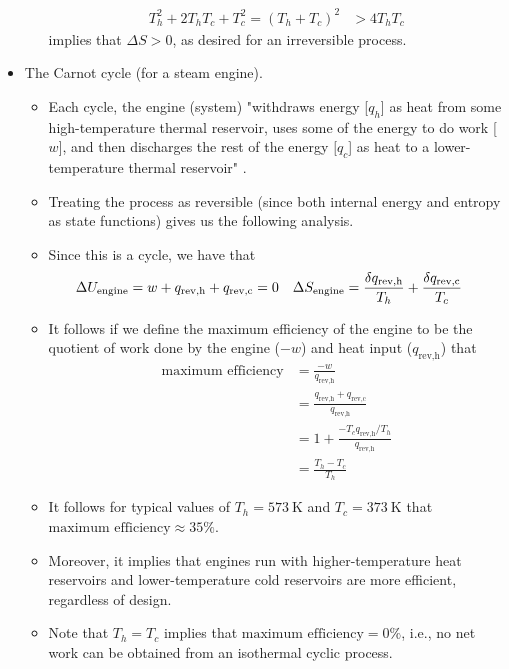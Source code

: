 \documentclass[../notes.tex]{subfiles}
\begin{document}
\begin{itemize}
\begin{itemize}
\begin{align*}
            T_h^2+2T_hT_c+T_c^2 = (T_h+T_c)^2 &> 4T_hT_c
        \end{align*}
        implies that $\Delta S>0$, as desired for an irreversible process.
    \end{itemize}
    \item The Carnot cycle (for a steam engine).
    \begin{itemize}
        \item Each cycle, the engine (system) "withdraws energy [$q_h$] as heat from some high-temperature thermal reservoir, uses some of the energy to do work [$w$], and then discharges the rest of the energy $[q_c$] as heat to a lower-temperature thermal reservoir" \parencite[838]{bib:McQuarrieSimon}.
        \item Treating the process as reversible (since both internal energy and entropy as state functions) gives us the following analysis.
        \item Since this is a cycle, we have that
        \begin{align*}
            \Delta U_\text{engine} &= w+q_\text{rev,h}+q_\text{rev,c} = 0&
            \Delta S_\text{engine} &= \frac{\var{q_\text{rev,h}}}{T_h}+\frac{\var{q_\text{rev,c}}}{T_c}
        \end{align*}
        \item It follows if we define the maximum efficiency of the engine to be the quotient of work done by the engine ($-w$) and heat input ($q_\text{rev,h}$) that
        \begin{align*}
            \text{maximum efficiency} &= \frac{-w}{q_\text{rev,h}}\\
            &= \frac{q_\text{rev,h}+q_\text{rev,c}}{q_\text{rev,h}}\\
            &= 1+\frac{-T_cq_\text{rev,h}/T_h}{q_\text{rev,h}}\\
            &= \frac{T_h-T_c}{T_h}
        \end{align*}
        \item It follows for typical values of $T_h=\SI{573}{\kelvin}$ and $T_c=\SI{373}{\kelvin}$ that $\text{maximum efficiency}\approx 35\%$.
        \item Moreover, it implies that engines run with higher-temperature heat reservoirs and lower-temperature cold reservoirs are more efficient, regardless of design.
        \item Note that $T_h=T_c$ implies that $\text{maximum efficiency}=0\%$, i.e., no net work can be obtained from an isothermal cyclic process.
    \end{itemize}

\end{itemize}
\end{document}
